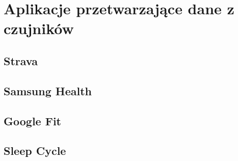 \section{Aplikacje przetwarzające dane z czujników}

\subsection{Strava}

\subsection{Samsung Health}

\subsection{Google Fit}

\subsection{Sleep Cycle}
